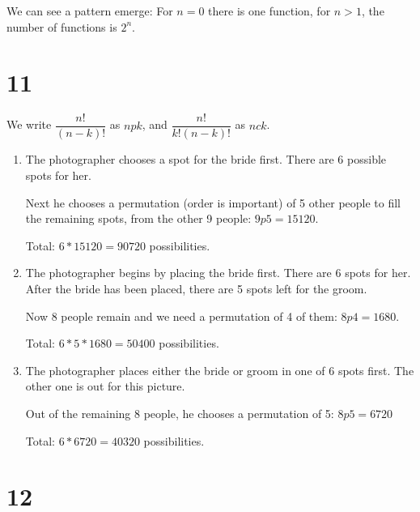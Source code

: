 \documentclass[12pt]{article}
\begin{document}
We can see a pattern emerge: For $n = 0$ there is one function, for $n > 1$, the number of functions is $2^n$.

\section*{11}
We write $\dfrac{n!}{(n - k)!}$ as $n p k$, and $\dfrac{n!}{k!(n - k)!}$ as $n c k$.

\begin{enumerate}[a]
	\item %
	The photographer chooses a spot for the bride first. There are 6 possible spots for her.

	Next he chooses a permutation (order is important) of 5 other people to fill the remaining spots, from the other 9 people: $9p5 = 15120$.

	Total: $6 * 15120 = 90720$ possibilities.
	\item %
	The photographer begins by placing the bride first. There are 6 spots for her. After the bride has been placed, there are 5 spots left for the groom.

	Now 8 people remain and we need a permutation of 4 of them: $8p4 = 1680$.

	Total: $6 * 5 * 1680 = 50400$ possibilities.
	\item %
	The photographer places either the bride or groom in one of 6 spots first. The other one is out for this picture.

	Out of the remaining 8 people, he chooses a permutation of 5: $8p5 = 6720$

	Total: $6 * 6720 = 40320$ possibilities.
\end{enumerate}

\section*{12}
\end{document}
